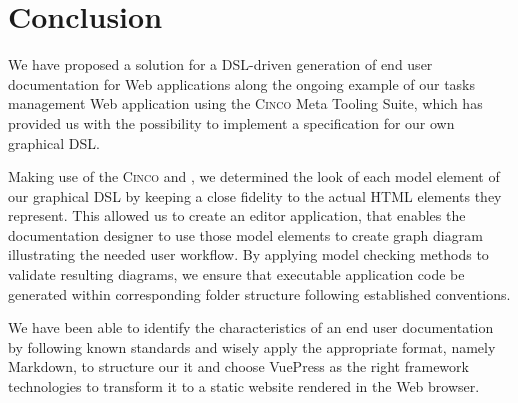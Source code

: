 \chapter{Conclusion}\label{ch:concl}

We have proposed a solution for a DSL-driven generation of end user documentation for Web applications along the ongoing example of our tasks management Web application using the \textsc{Cinco} Meta Tooling Suite, which has provided us with the possibility to implement a specification for our own graphical DSL.

Making use of the \textsc{Cinco}  and , we determined the look of each model element of our graphical DSL by keeping a close fidelity to the actual HTML elements they represent. This allowed us to create an editor application, that enables the documentation designer to use those model elements to create graph diagram illustrating the needed user workflow. By applying model checking methods to validate resulting diagrams, we ensure that executable application code be generated within corresponding folder structure following established conventions.

We have been able to identify the characteristics of an end user documentation by following known standards and wisely apply the appropriate format, namely Markdown, to structure our it and choose VuePress as the right framework technologies to transform it to a static website rendered in the Web browser.